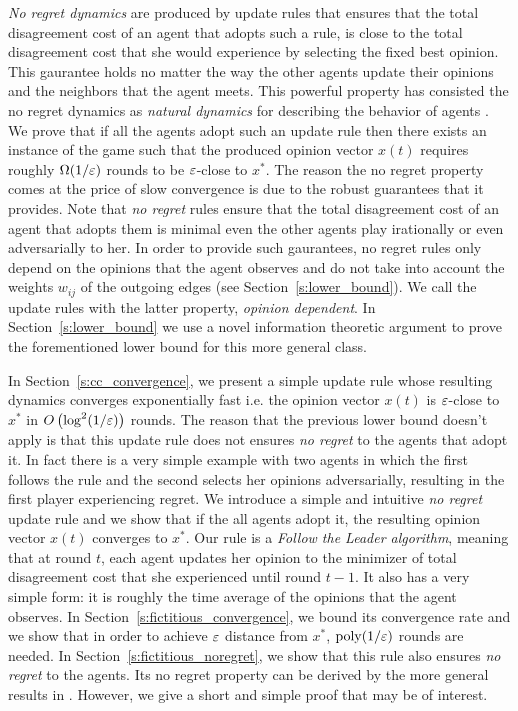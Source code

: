 \emph{No regret dynamics} are produced by update rules
that ensures that the total disagreement cost of an
agent that adopts such a rule, is close to the total 
disagreement cost that she would experience by selecting
the fixed best opinion. This gaurantee holds no matter
the way the other agents update their opinions and the 
neighbors that the agent meets. This powerful property
has consisted the no regret dynamics as \emph{natural dynamics}
for describing the behavior of agents \cite{EMN09}.
We prove that if all the agents adopt such an update rule
then there exists an instance of the game such that the produced opinion 
vector $x(t)$ requires roughly $\Omega(1/\varepsilon)$ rounds to 
be $\varepsilon$-close to $x^*$. The reason the no regret property
comes at the price of slow convergence is due to the robust
guarantees that it provides. Note that \emph{no regret} rules 
ensure that the total disagreement cost of an agent that adopts them is minimal 
even the other agents play irationally or even adversarially to her.
In order to provide such gaurantees, no regret rules only depend on
the opinions that the agent observes and do not take into account 
the weights $w_{ij}$ of the outgoing edges (see Section~\ref{s:lower_bound}).
We call the update rules with the latter property, \emph{opinion dependent}.
In Section~\ref{s:lower_bound} we use a novel information theoretic argument
to prove the forementioned lower bound for this more general class. 

In Section~\ref{s:cc_convergence}, we present a simple update rule
whose resulting dynamics converges exponentially fast i.e. 
the opinion vector $x(t)$ is $\varepsilon$-close to $x^*$ in 
$O\left(\log^2 (1/\varepsilon)\right)$ rounds. The reason that the previous lower
bound doesn't apply is that this update rule does not ensures \emph{no regret}
to the agents that adopt it. In fact there is a very 
simple example with two agents in which the first follows the rule 
and the second selects her opinions adversarially, resulting in 
the first player experiencing regret.
We introduce a simple and intuitive \emph{no regret} update rule and we
show that if the all agents adopt it, the resulting opinion vector $x(t)$ converges
to $x^*$.  Our rule is a \emph{Follow the Leader algorithm}, meaning
that at round $t$, each agent updates her opinion to the minimizer of total
disagreement cost that she experienced until round $t-1$.  It also has a very
simple form: it is roughly the time average of the opinions that the agent
observes.  In Section~\ref{s:fictitious_convergence}, we bound its convergence
rate and we show that in order to achieve $\varepsilon$ distance from $x^*$,
$\mathrm{poly}(1/\varepsilon)$ rounds are needed.  In Section~\ref{s:fictitious_noregret}, 
we show that this rule also ensures \emph{no regret} to the agents. 
Its no regret property can be derived by the
more general results in \cite{HAK07}.  However, we give a short and simple
proof that may be of interest.

